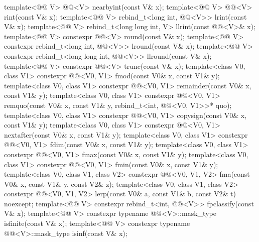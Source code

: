 \begin{codeblock}
{  template<@@ V> @@<V> nearbyint(const V& x);
  template<@@ V> @@<V> rint(const V& x);
  template<@@ V>
    rebind_t<long int, @@<V>> lrint(const V& x);
  template<@@ V>
    rebind_t<long long int, V> llrint(const @@<V>& x);
  template<@@ V>
    constexpr @@<V> round(const V& x);
  template<@@ V>
    constexpr rebind_t<long int, @@<V>> lround(const V& x);
  template<@@ V>
    constexpr rebind_t<long long int, @@<V>> llround(const V& x);
  template<@@ V>
    constexpr @@<V> trunc(const V& x);
  template<class V0, class V1>
    constexpr @@<V0, V1> fmod(const V0& x, const V1& y);
  template<class V0, class V1>
    constexpr @@<V0, V1> remainder(const V0& x, const V1& y);
  template<class V0, class V1>
    constexpr @@<V0, V1>
      remquo(const V0& x, const V1& y, rebind_t<int, @@<V0, V1>>* quo);
  template<class V0, class V1>
    constexpr @@<V0, V1> copysign(const V0& x, const V1& y);
  template<class V0, class V1>
    constexpr @@<V0, V1> nextafter(const V0& x, const V1& y);
  template<class V0, class V1>
    constexpr @@<V0, V1> fdim(const V0& x, const V1& y);
  template<class V0, class V1>
    constexpr @@<V0, V1> fmax(const V0& x, const V1& y);
  template<class V0, class V1>
    constexpr @@<V0, V1> fmin(const V0& x, const V1& y);
  template<class V0, class V1, class V2>
    constexpr @@<V0, V1, V2> fma(const V0& x, const V1& y, const V2& z);
  template<class V0, class V1, class V2>
    constexpr @@<V0, V1, V2>
      lerp(const V0& a, const V1& b, const V2& t) noexcept;
  template<@@ V>
    constexpr rebind_t<int, @@<V>> fpclassify(const V& x);
  template<@@ V>
    constexpr typename @@<V>::mask_type isfinite(const V& x);
  template<@@ V>
    constexpr typename @@<V>::mask_type isinf(const V& x);
}
\end{codeblock}
